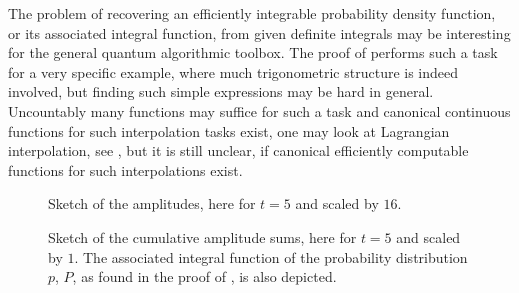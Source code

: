 \begin{remark}
    The problem of recovering an efficiently integrable probability density function, or its associated integral function, from given definite integrals may be interesting for the general quantum algorithmic toolbox. The proof of  performs such a task for a very specific example, where much trigonometric structure is indeed involved, but finding such simple expressions may be hard in general. Uncountably many functions may suffice for such a task and canonical continuous functions for such interpolation tasks exist, one may look at Lagrangian interpolation, see \cite[p. 192]{Fischer2017}, but it is still unclear, if canonical efficiently computable functions for such interpolations exist.
\end{remark}

\phantom{}

\begin{figure}[!hbtp]
    \centering
    \caption{Sketch of the amplitudes, here for \(t = 5\) and scaled by \(16\).}
    \label{sketch_of_the_amplitudes}
\end{figure}

\begin{figure}[!hbtp]
    \centering
    \caption{Sketch of the cumulative amplitude sums, here for \(t = 5\) and scaled by \(1\). The associated integral function of the probability distribution \(p\), \(P\), as found in the proof of , is also depicted.}
    \label{sketch_of_the_cumulative_amplitude_sums}
\end{figure}

